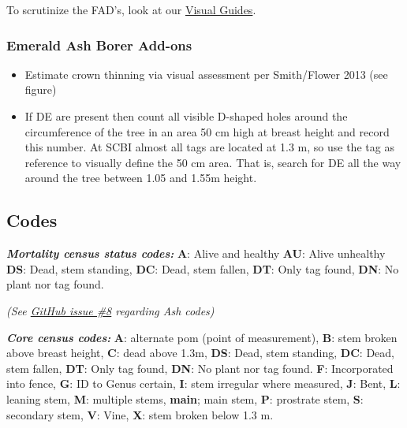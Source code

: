 \documentclass[
]{article}
\providecommand{\tightlist}{%
  \setlength{\itemsep}{0pt}\setlength{\parskip}{0pt}}
\begin{document}
To scrutinize the FAD's, look at our
\href{https://github.com/SCBI-ForestGEO/SCBImortality/blob/main/Protocols/Visual\%20guides/Tree\%20Mortality\%20Guide_2020.pdf}{Visual
Guides}.

\hypertarget{emerald-ash-borer-add-ons}{%
\subsubsection{Emerald Ash Borer
Add-ons}\label{emerald-ash-borer-add-ons}}

\begin{itemize}
\tightlist
\item
  Estimate crown thinning via visual assessment per Smith/Flower 2013
  (see figure)
\item
  If DE are present then count all visible D-shaped holes around the
  circumference of the tree in an area 50 cm high at breast height and
  record this number. At SCBI almost all tags are located at 1.3 m, so
  use the tag as reference to visually define the 50 cm area. That is,
  search for DE all the way around the tree between 1.05 and 1.55m
  height.
\end{itemize}

\newpage

\hypertarget{codes}{%
\subsection{Codes}\label{codes}}

\textbf{\emph{Mortality census status codes:}} \textbf{A}: Alive and
healthy \textbf{AU}: Alive unhealthy \textbf{DS}: Dead, stem standing,
\textbf{DC}: Dead, stem fallen, \textbf{DT}: Only tag found,
\textbf{DN}: No plant nor tag found.

\emph{(See
\href{https://github.com/SCBI-ForestGEO/SCBImortality/issues/8}{GitHub
issue \#8} regarding Ash codes)}

\textbf{\emph{Core census codes:}} \textbf{A}: alternate pom (point of
measurement), \textbf{B}: stem broken above breast height, \textbf{C}:
dead above 1.3m, \textbf{DS}: Dead, stem standing, \textbf{DC}: Dead,
stem fallen, \textbf{DT}: Only tag found, \textbf{DN}: No plant nor tag
found. \textbf{F}: Incorporated into fence, \textbf{G}: ID to Genus
certain, \textbf{I}: stem irregular where measured, \textbf{J}: Bent,
\textbf{L}: leaning stem, \textbf{M}: multiple stems, \textbf{main};
main stem, \textbf{P}: prostrate stem, \textbf{S}: secondary stem,
\textbf{V}: Vine, \textbf{X}: stem broken below 1.3 m.
\end{document}
